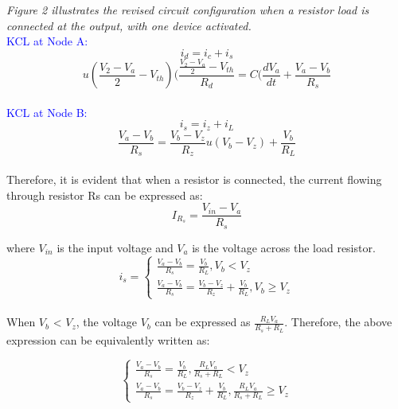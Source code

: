 \emph{Figure 2 illustrates the revised circuit configuration when a resistor load is connected at the output, with one device activated.}\\

\textcolor{blue}{KCL at Node A:}\\
\begin{equation}
    i_d=i_c+i_s
\end{equation}
\begin{equation}
    u(\frac{V_2-V_a}{2}-V_{th})(\frac{\frac{V_2-V_a}{2}-V_{th}}{R_d}=C(\frac{dV_a}{dt}+\frac{V_a-V_b}{R_s}
\end{equation}\\

\textcolor{blue}{KCL at Node B:}\\
\begin{equation}
    i_s=i_z+i_L
\end{equation}
\begin{equation}
    \frac{V_a-V_b}{R_s}=\frac{V_b-V_z}{R_z}u(V_b-V_z)+\frac{V_b}{R_L}
\end{equation}\\

Therefore, it is evident that when a resistor is connected, the current flowing through resistor Rs can be expressed as:
\begin{equation}
    I_{R_s} = \frac{V_{in} - V_a}{R_s}
\end{equation}


where $V_{in}$ is the input voltage and $V_a$ is the voltage across the load resistor.\\

\begin{equation}
    i_s=\begin{cases}
        \frac{V_a-V_b}{R_s}=\frac{V_b}{R_L},  V_b<V_z\\
        \frac{V_a-V_b}{R_s}=\frac{V_b-V_z}{R_z}+\frac{V_b}{R_L},  V_b \geq V_z
    \end{cases}
\end{equation}\\

When $V_b$ < $V_z$, the voltage $V_b$ can be expressed as $\frac{R_LV_a}{R_s+R_L}$. Therefore, the above expression can be equivalently written as:

\begin{equation}
    \begin{cases}
        \frac{V_a-V_b}{R_s}=\frac{V_b}{R_L}, \frac{R_LV_a}{R_s+R_L}<V_z\\
        \frac{V_a-V_b}{R_s}=\frac{V_b-V_z}{R_z}+\frac{V_b}{R_L}, \frac{R_LV_a}{R_s+R_L} \geq V_z
    \end{cases}
\end{equation}\\

